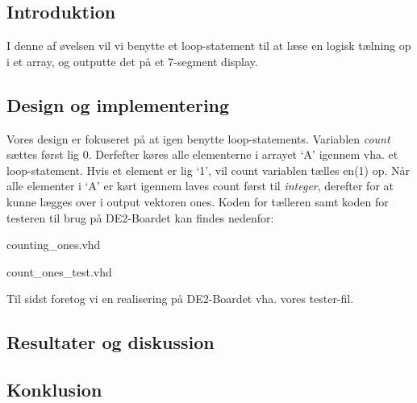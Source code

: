 \documentclass[../journal.tex]{subfiles}
\begin{document}
\subsection{Introduktion}
I denne af øvelsen vil vi benytte et loop-statement til at læse en logisk tælning op i et array, og outputte det på et 7-segment display.

\subsection{Design og implementering}
Vores design er fokuseret på at igen benytte loop-statements. Variablen \textit{count} sættes først lig 0. Derfefter køres alle elementerne i arrayet `A' igennem vha. et loop-statement. Hvis et element er lig `1', vil count variablen tælles en(1) op. Når alle elementer i `A' er kørt igennem laves count først til \textit{integer}, derefter  for at kunne lægges over i output vektoren ones. Koden for tælleren samt koden for testeren til brug på DE2-Boardet kan findes nedenfor:

\begin{table}[H]
    \centering
      \framebox{
        \rule{8pt}{0pt}
          
  }
  \caption{counting\_ones.vhd}	
  \label{src:TabConTest}
\end{table}

\begin{table}[H]
    \centering
      \framebox{
        \rule{8pt}{0pt}
          
  }
  \caption{count\_ones\_test.vhd}	
  \label{src:TabConTest}
\end{table}


Til sidst foretog vi en realisering på DE2-Boardet vha. vores tester-fil. 


\subsection{Resultater og diskussion}




\subsection{Konklusion}
\end{document}
